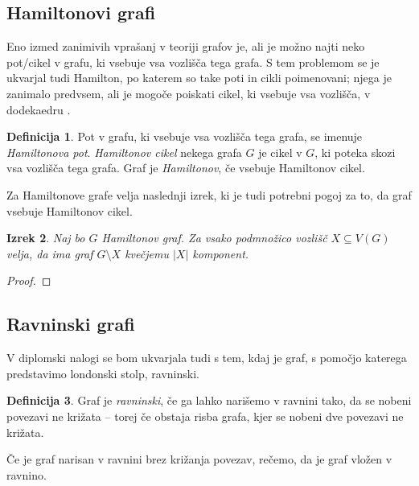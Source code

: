 \documentclass[12pt,a4paper]{amsart}
\theoremstyle{definition} %
\newtheorem{definicija}{Definicija}[section]
\theoremstyle{plain} %
\newtheorem{izrek}[definicija]{Izrek}
\begin{document}
\subsection{Hamiltonovi grafi}

Eno izmed zanimivih vprašanj v teoriji grafov je, ali je možno najti neko pot/cikel v grafu, ki vsebuje vsa vozlišča tega grafa. S tem problemom se je ukvarjal tudi Hamilton, po katerem so take poti in cikli poimenovani; njega je zanimalo predvsem, ali je mogoče poiskati cikel, ki vsebuje vsa vozlišča, v dodekaedru \cite{bib:wikihamilpath}.

\begin{definicija}
	Pot v grafu, ki vsebuje vsa vozlišča tega grafa, se imenuje \emph{Hamiltonova pot}.
	\emph{Hamiltonov cikel} nekega grafa $G$ je cikel v $G$, ki poteka skozi vsa vozlišča tega grafa.
	Graf je \emph{Hamiltonov}, če vsebuje Hamiltonov cikel.
\end{definicija}

Za Hamiltonove grafe velja naslednji izrek, ki je tudi potrebni pogoj za to, da graf vsebuje Hamiltonov cikel.

\begin{izrek}
	Naj bo $G$ Hamiltonov graf. Za vsako podmnožico vozlišč $X \subseteq V(G)$ velja, da ima graf $G \setminus X$ kvečjemu $|X|$ komponent.
\end{izrek}

\begin{proof}
    
\end{proof}

\subsection{Ravninski grafi}

V diplomski nalogi se bom ukvarjala tudi s tem, kdaj je graf, s pomočjo katerega predstavimo londonski stolp, ravninski.

\begin{definicija}
    Graf je \emph{ravninski}, če ga lahko narišemo v ravnini tako, da se nobeni povezavi ne križata -- torej če obstaja risba grafa, kjer se nobeni dve povezavi ne križata.
\end{definicija}

Če je graf narisan v ravnini brez križanja povezav, rečemo, da je graf vložen v ravnino.
\end{document}
